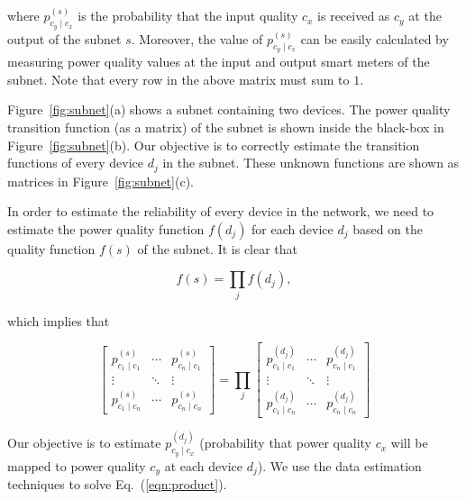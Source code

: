 \noindent
where $p_{c_y  \mid c_x}^{(s)}$ is the probability that the input quality $c_x$ is received as $c_y$ at the output of the subnet $s$. Moreover, the value of $p_{c_y  \mid c_x}^{(s)}$ can be easily calculated by measuring power quality values at the input and output smart meters of the subnet. Note that every row in the above matrix must sum to $1$.

Figure~\ref{fig:subnet}(a) shows a subnet containing two devices. The power quality transition function (as a matrix) of the subnet is shown inside the black-box in Figure~\ref{fig:subnet}(b). Our objective is to correctly estimate the transition functions of every device $d_j$ in the subnet. These unknown functions are shown as matrices in Figure~\ref{fig:subnet}(c).

In order to estimate the reliability of every device in the network, we need to estimate the power quality function $f(d_j)$ for each device $d_j$ based on the quality function $f(s)$ of the subnet. It is clear that

\begin{equation}
f(s) = \prod_{j} f(d_j),
\end{equation}

\noindent
which implies that

\begin{equation}
\left[\begin{array}{ccc}
p_{c_1  \mid c_1}^{(s)} & \cdots & p_{c_n  \mid c_1}^{(s)}\\
\vdots & \ddots & \vdots\\
p_{c_1  \mid c_n}^{(s)} & \cdots & p_{c_n  \mid c_n}^{(s)}
\end{array}\right]= \prod_j { \left[\begin{array}{ccc}
p_{c_1 \mid c_1}^{(d_j)} & \cdots & p_{c_n  \mid c_1}^{(d_j)}\\
\vdots & \ddots & \vdots\\
p_{c_1 \mid c_n}^{(d_j)} & \cdots & p_{c_n \mid c_n}^{(d_j)}\end{array}\right]}
\label{eqn:product}
\end{equation}

Our objective is to estimate $p_{c_y \mid c_x}^{(d_j)}$ (probability that power quality $c_x$ will be mapped to power quality $c_y$ at each device $d_j$). We use the data estimation techniques to solve Eq.~(\ref{eqn:product}).


